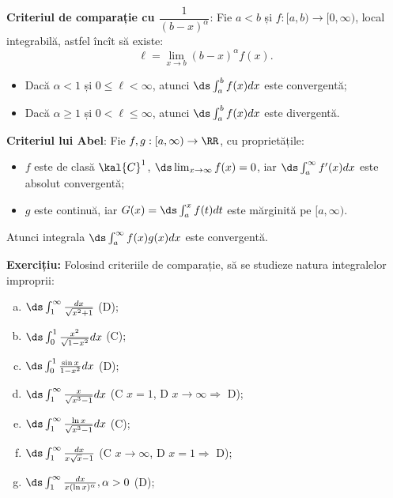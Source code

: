 \vspace{0.5cm}

\textbf{Criteriul de comparație cu $\dfrac{1}{(b - x)^\alpha}$}: Fie $a < b$ și
$f : [a, b) \to [0, \infty)$, local integrabilă, astfel încît să existe:
\[
  \ell = \lim_{x \to b} (b - x)^\alpha f(x).
\]
\begin{itemize}
\item Dacă $\alpha < 1$ și $0 \leq \ell < \infty$, atunci $\ds\int_a^b f(x) dx$
  este convergentă;
\item Dacă $\alpha \geq 1$ și $0 < \ell \leq \infty$, atunci $\ds\int_a^b f(x) dx$
  este divergentă.
\end{itemize}

\vspace{0.5cm}

\textbf{Criteriul lui Abel}: Fie $f, g : [a, \infty) \to \RR$, cu proprietățile:
\begin{itemize}
\item $f$ este de clasă $\kal{C}^1$, $\ds\lim_{x \to \infty} f(x) = 0$, iar
  $\ds\int_a^\infty f'(x) dx$ este absolut convergentă;
\item $g$ este continuă, iar $G(x) = \ds\int_a^x f(t) dt$ este mărginită pe
  $[a, \infty)$.
\end{itemize}
Atunci integrala $\ds\int_a^\infty f(x) g(x) dx$ este convergentă.

\vspace{0.5cm}

\textbf{Exercițiu:} 
Folosind criteriile de comparație, să se studieze natura integralelor improprii:
\begin{enumerate}[(a)]
\item $\ds\int_1^\infty \frac{dx}{\sqrt{x^2 + 1}}$ \hfill(D);
\item $\ds\int_0^1 \frac{x^2}{\sqrt{1 - x^2}} dx$ \hfill(C);
\item $\ds\int_0^1 \frac{\sin x}{1 - x^2} dx$ \hfill(D);
\item $\ds\int_1^\infty \frac{x}{\sqrt{x^3 - 1}} dx$ \hfill(C $x = 1$, D
  $x \to \infty \Rightarrow$ D);
\item $\ds\int_1^\infty \frac{\ln x}{\sqrt{x^3 - 1}} dx$ \hfill(C);
\item $\ds\int_1^\infty \frac{dx}{x \sqrt{x} - 1} $ \hfill(C $x \to \infty$,
  D $x = 1 \Rightarrow$ D);
\item $\ds\int_1^\infty \frac{dx}{x(\ln x)^\alpha}, \alpha > 0$ \hfill(D);
\end{enumerate}


